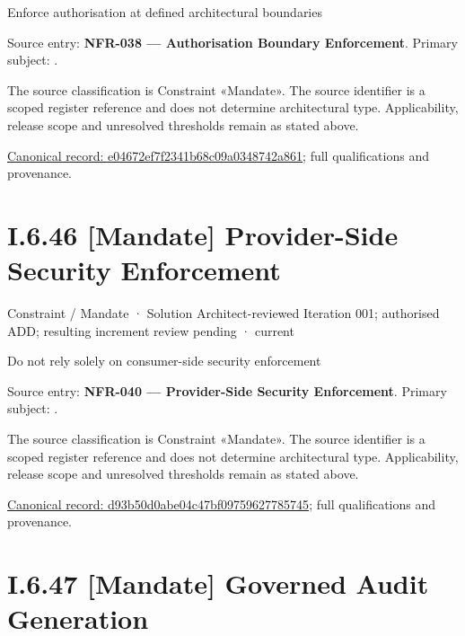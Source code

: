 Enforce authorisation at defined architectural boundaries



Source entry: \textbf{NFR-038 — Authorisation Boundary Enforcement}. Primary subject: \texttt{}.



The source classification is Constraint «Mandate». The source identifier is a scoped register reference and does not determine architectural type. Applicability, release scope and unresolved thresholds remain as stated above.


{\footnotesize \href{../../../../continuum/motivation/constraint/mandate/e04672ef7f2341b68c09a0348742a861.md}{Canonical record: e04672ef7f2341b68c09a0348742a861}; full qualifications and provenance.}\par
\section*{I.6.46 [Mandate] Provider-Side Security Enforcement}
\label{navigation:I.6.46}

\label{element:d93b50d0abe04c47bf09759627785745}
{\small Constraint / Mandate · Solution Architect-reviewed Iteration 001; authorised ADD; resulting increment review pending · current}\par

Do not rely solely on consumer-side security enforcement



Source entry: \textbf{NFR-040 — Provider-Side Security Enforcement}. Primary subject: \texttt{}.



The source classification is Constraint «Mandate». The source identifier is a scoped register reference and does not determine architectural type. Applicability, release scope and unresolved thresholds remain as stated above.


{\footnotesize \href{../../../../continuum/motivation/constraint/mandate/d93b50d0abe04c47bf09759627785745.md}{Canonical record: d93b50d0abe04c47bf09759627785745}; full qualifications and provenance.}\par
\section*{I.6.47 [Mandate] Governed Audit Generation}
\label{navigation:I.6.47}

